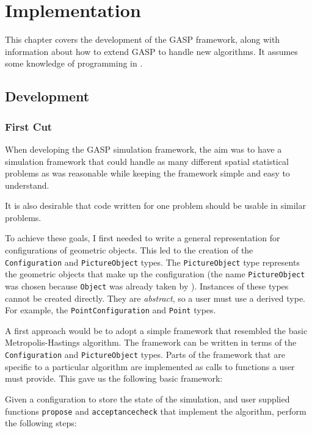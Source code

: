 
\chapter{Implementation}

This chapter covers the development of the GASP framework, along with
information about how to extend GASP to handle new algorithms.  It
assumes some knowledge of programming in \GAP{}.

\section{Development}

\subsection{First Cut}

When developing the GASP simulation framework, the aim was to have a
simulation framework that could handle as many different spatial
statistical problems as was reasonable while keeping the framework
simple and easy to understand.

It is also desirable that code written for one problem should be
usable in similar problems.

To achieve these goals, I first needed to write a general
representation for configurations of geometric objects.  This led to
the creation of the \texttt{Configuration} and
\texttt{Picture\-Object} types.  The \texttt{Picture\-Object} type
represents the geometric objects that make up the configuration (the
name \texttt{Picture\-Object} was chosen because \texttt{Object} was
already taken by \GAP{}).  Instances of these types cannot be created
directly.  They are \emph{abstract}, so a user must use a derived
type.  For example, the \texttt{Point\-Configuration} and
\texttt{Point} types.

A first approach would be to adopt a simple framework that resembled
the basic Metropolis-Hastings algorithm.  The framework can be written
in terms of the \texttt{Configuration} and \texttt{Picture\-Object}
types.  Parts of the framework that are specific to a particular
algorithm are implemented as calls to functions a user must provide.
This gave us the following basic framework:

Given a configuration to store the state of the simulation, and
user supplied functions \texttt{propose} and \texttt{acceptancecheck}
that implement the algorithm, perform the following steps:


